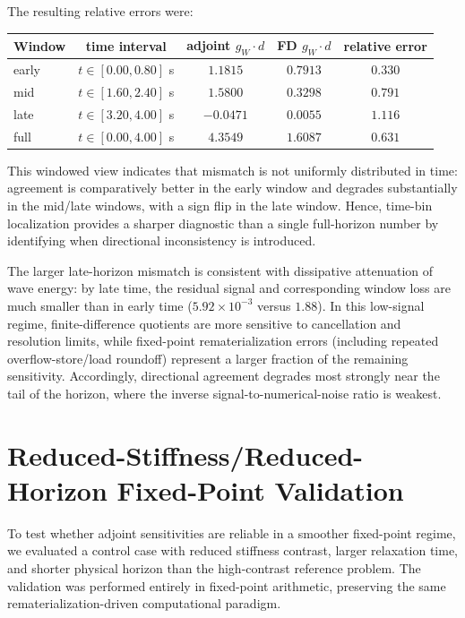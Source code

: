 \documentclass[11pt]{article}
\begin{document}
The resulting relative errors were:
\begin{center}
\begin{tabular}{@{}lcccc@{}}
\toprule
Window & time interval & adjoint \(g_W\cdot d\) & FD \(g_W\cdot d\) & relative error \\
\midrule
early & \(t\in[0.00,0.80]\) s & \(1.1815\) & \(0.7913\) & \(0.330\) \\
mid & \(t\in[1.60,2.40]\) s & \(1.5800\) & \(0.3298\) & \(0.791\) \\
late & \(t\in[3.20,4.00]\) s & \(-0.0471\) & \(0.0055\) & \(1.116\) \\
full & \(t\in[0.00,4.00]\) s & \(4.3549\) & \(1.6087\) & \(0.631\) \\
\bottomrule
\end{tabular}
\end{center}

This windowed view indicates that mismatch is not uniformly distributed in time: agreement is comparatively better in the early window and degrades substantially in the mid/late windows, with a sign flip in the late window.
Hence, time-bin localization provides a sharper diagnostic than a single full-horizon number by identifying when directional inconsistency is introduced.

The larger late-horizon mismatch is consistent with dissipative attenuation of wave energy: by late time, the residual signal and corresponding window loss are much smaller than in early time (\(5.92\times10^{-3}\) versus \(1.88\)).
In this low-signal regime, finite-difference quotients are more sensitive to cancellation and resolution limits, while fixed-point rematerialization errors (including repeated overflow-store/load roundoff) represent a larger fraction of the remaining sensitivity.
Accordingly, directional agreement degrades most strongly near the tail of the horizon, where the inverse signal-to-numerical-noise ratio is weakest.

\section{Reduced-Stiffness/Reduced-Horizon Fixed-Point Validation}
To test whether adjoint sensitivities are reliable in a smoother fixed-point regime, we evaluated a control case with reduced stiffness contrast, larger relaxation time, and shorter physical horizon than the high-contrast reference problem.
The validation was performed entirely in fixed-point arithmetic, preserving the same rematerialization-driven computational paradigm.
\end{document}
